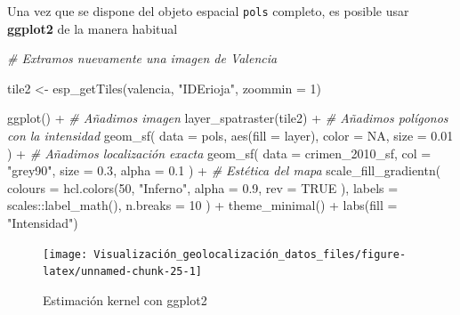 \documentclass[
]{book}
\newenvironment{Shaded}{\begin{snugshade}}{\end{snugshade}}
\newcommand{\AttributeTok}[1]{\textcolor[rgb]{0.77,0.63,0.00}{#1}}
\newcommand{\CommentTok}[1]{\textcolor[rgb]{0.56,0.35,0.01}{\textit{#1}}}
\newcommand{\ConstantTok}[1]{\textcolor[rgb]{0.00,0.00,0.00}{#1}}
\newcommand{\DecValTok}[1]{\textcolor[rgb]{0.00,0.00,0.81}{#1}}
\newcommand{\FloatTok}[1]{\textcolor[rgb]{0.00,0.00,0.81}{#1}}
\newcommand{\FunctionTok}[1]{\textcolor[rgb]{0.00,0.00,0.00}{#1}}
\newcommand{\NormalTok}[1]{#1}
\newcommand{\OtherTok}[1]{\textcolor[rgb]{0.56,0.35,0.01}{#1}}
\newcommand{\SpecialCharTok}[1]{\textcolor[rgb]{0.00,0.00,0.00}{#1}}
\newcommand{\StringTok}[1]{\textcolor[rgb]{0.31,0.60,0.02}{#1}}
\theoremstyle{definition}
\theoremstyle{definition}
\theoremstyle{definition}
\theoremstyle{definition}
\theoremstyle{remark}
\begin{document}
Una vez que se dispone del objeto espacial \texttt{pols} completo, es posible usar
\textbf{ggplot2} de la manera habitual

\begin{Shaded}
\begin{Highlighting}[]

\CommentTok{\# Extramos nuevamente una imagen de Valencia}

\NormalTok{tile2 }\OtherTok{\textless{}{-}} \FunctionTok{esp\_getTiles}\NormalTok{(valencia, }\StringTok{"IDErioja"}\NormalTok{, }\AttributeTok{zoommin =} \DecValTok{1}\NormalTok{)}

\FunctionTok{ggplot}\NormalTok{() }\SpecialCharTok{+}
  \CommentTok{\# Añadimos imagen}
  \FunctionTok{layer\_spatraster}\NormalTok{(tile2) }\SpecialCharTok{+}
  \CommentTok{\# Añadimos polígonos con la intensidad}
  \FunctionTok{geom\_sf}\NormalTok{(}
    \AttributeTok{data =}\NormalTok{ pols, }\FunctionTok{aes}\NormalTok{(}\AttributeTok{fill =}\NormalTok{ layer),}
    \AttributeTok{color =} \ConstantTok{NA}\NormalTok{, }\AttributeTok{size =} \FloatTok{0.01}
\NormalTok{  ) }\SpecialCharTok{+}
  \CommentTok{\# Añadimos localización exacta}
  \FunctionTok{geom\_sf}\NormalTok{(}
    \AttributeTok{data =}\NormalTok{ crimen\_2010\_sf, }\AttributeTok{col =} \StringTok{"grey90"}\NormalTok{,}
    \AttributeTok{size =} \FloatTok{0.3}\NormalTok{,}
    \AttributeTok{alpha =} \FloatTok{0.1}
\NormalTok{  ) }\SpecialCharTok{+}
  \CommentTok{\# Estética del mapa}
  \FunctionTok{scale\_fill\_gradientn}\NormalTok{(}
    \AttributeTok{colours =} \FunctionTok{hcl.colors}\NormalTok{(}\DecValTok{50}\NormalTok{, }\StringTok{"Inferno"}\NormalTok{,}
      \AttributeTok{alpha =} \FloatTok{0.9}\NormalTok{, }\AttributeTok{rev =} \ConstantTok{TRUE}
\NormalTok{    ),}
    \AttributeTok{labels =}\NormalTok{ scales}\SpecialCharTok{::}\FunctionTok{label\_math}\NormalTok{(),}
    \AttributeTok{n.breaks =} \DecValTok{10}
\NormalTok{  ) }\SpecialCharTok{+}
  \FunctionTok{theme\_minimal}\NormalTok{() }\SpecialCharTok{+}
  \FunctionTok{labs}\NormalTok{(}\AttributeTok{fill =} \StringTok{"Intensidad"}\NormalTok{)}
\end{Highlighting}
\end{Shaded}

\begin{figure}

{\centering \texttt{[image: Visualización\_geolocalización\_datos\_files/figure-latex/unnamed-chunk-25-1]} 

}

\caption{Estimación kernel con ggplot2}\label{fig:unnamed-chunk-25}
\end{figure}
\end{document}
